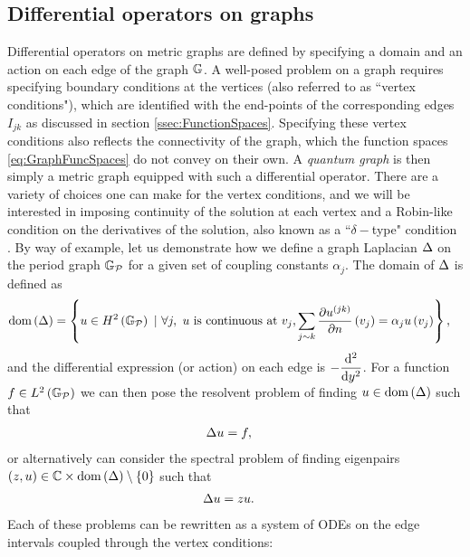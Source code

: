 \subsection{Differential operators on graphs} \label{ssec:DiffOpsOnGraphs}
Differential operators on metric graphs are defined by specifying a domain and an action on each edge of the graph $\mathbb{G}$.
A well-posed problem on a graph requires specifying boundary conditions at the vertices (also referred to as ``vertex conditions"), which are identified with the end-points of the corresponding edges $I_{jk}$ as discussed in section \ref{ssec:FunctionSpaces}.
Specifying these vertex conditions also reflects the connectivity of the graph, which the function spaces \eqref{eq:GraphFuncSpaces} do not convey on their own.
A \emph{quantum graph} is then simply a metric graph equipped with such a differential operator.
There are a variety of choices one can make for the vertex conditions, and we will be interested in imposing continuity of the solution at each vertex and a Robin-like condition on the derivatives of the solution, also known as a ``$\delta-$type" condition \cite{albeverio2012solvable, berkolaiko2013introduction}.
By way of example, let us demonstrate how we define a graph Laplacian $\Delta$ on the period graph $\mathbb{G}_{\mathcal{P}}$ for a given set of coupling constants $\alpha_j$.
The domain of $\Delta$ is defined as
\begin{align} \label{eq:GraphLaplacianExample}
	\mathrm{dom}\left( \Delta \right) &= \left\{  u\in H^2\left( \mathbb{G}_{\mathcal{P}} \right) \ \vert \ \forall j, \ u \text{ is continuous at } v_j, \sum_{j\sim k}\dfrac{\partial u^{(jk)}}{\partial n}\left( v_j \right) = \alpha_j u\left( v_j \right)  \right\},
\end{align}
and the differential expression (or action) on each edge is $-\dfrac{\mathrm{d}^2 }{\mathrm{d} {y}^2}$.
For a function $f\in L^2\left( \mathbb{G}_{\mathcal{P}} \right)$ we can then pose the resolvent problem of finding $u\in\mathrm{dom}\left( \Delta \right)$ such that
\begin{align*}
	\Delta u &= f,
\end{align*}
or alternatively can consider the spectral problem of finding eigenpairs $\left( z,u \right)\in\mathbb{C}\times\mathrm{dom}\left( \Delta \right)\setminus\left\{ 0 \right\}$ such that
\begin{align*}
	\Delta u &= z u.
\end{align*}
Each of these problems can be rewritten as a system of ODEs on the edge intervals coupled through the vertex conditions:
